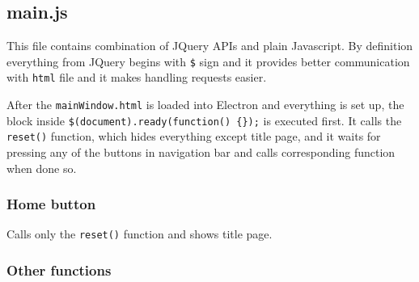 \documentclass[12pt]{article}
\let\oldtexttt\texttt
\renewcommand{\texttt}[1]{\oldtexttt{\textcolor{codehighlight}{#1}}}
\begin{document}
\hypertarget{main.js}{%
\subsection{main.js}\label{main.js}}

This file contains combination of JQuery APIs and plain Javascript. By
definition everything from JQuery begins with \texttt{\$} sign and it
provides better communication with \texttt{html} file and it makes
handling requests easier.

After the \texttt{mainWindow.html} is loaded into Electron and
everything is set up, the block inside
\texttt{\$(document).ready(function()\ \{\});} is executed first. It
calls the \texttt{reset()} function, which hides everything except title
page, and it waits for pressing any of the buttons in navigation bar and
calls corresponding function when done so.

\hypertarget{home-button}{%
\subsubsection{Home button}\label{home-button}}

Calls only the \texttt{reset()} function and shows title page.

\hypertarget{other-functions}{%
\subsubsection{Other functions}\label{other-functions}}
\end{document}
